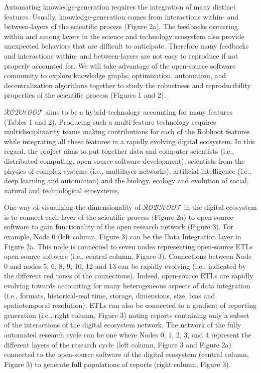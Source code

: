 \documentclass[10pt, a4paper, twocolumn]{article} %
\begin{document}
{  Automating knowledge-generation requires the integration of many
  distinct features. Usually, knowledge-generation comes from
  interactions within- and between-layers of the scientific process
  (Figure 2a). The feedbacks occurring within and among layers in the
  science and technology ecosystem also provide unexpected behaviors
  that are difficult to anticipate. Therefore many feedbacks and
  interactions within- and between-layers are not easy to reproduce if
  not properly accounted for. We will take advantage of the
  open-source software community to explore knowledge graphs,
  optimization, automation, and decentralization algorithms together
  to study the robustness and reproducibility properties of the
  scientific process (Figures 1 and 2).

  {\bf $\mathcal{ROBHOOT}$} aims to be a hybrid-technology accounting
  for many features (Tables 1 and 2). Producing such a multi-feature
  technology requires multidisciplinarity teams making contributions
  for each of the Robhoot features while integrating all these
  features in a rapidly evolving digital ecosystem. In this regard,
  the project aims to put together data and computer scientists (i.e.,
  distributed computing, open-source software development), scientists
  from the physics of complex systems (i.e., multilayer networks),
  artificial intelligence (i.e., deep learning and automation) and the
  biology, ecology and evolution of social, natural and technological
  ecosystems.

  One way of visualizing the dimensionality of $\mathcal{ROBHOOT}$ in
  the digital ecosystem is to connect each layer of the scientific
  process (Figure 2a) to open-source software to gain functionality of
  the open research network (Figure 3). For example, Node 0 (left
  column, Figure 3) can be the Data Integration layer in Figure
  2a. This node is connected to seven nodes representing open-source
  ETLs open-source software (i.e., central column, Figure
  3). Connections between Node 0 and nodes 5, 6, 8, 9, 10, 12 and 13
  can be rapidly evolving (i.e., indicated by the different red tones
  of the connections). Indeed, open-source ETLs are rapidly evolving
  towards accounting for many heterogeneous aspects of data
  integration (i.e., formats, historical-real time, storage,
  dimensions, size, bias and spatiotemporal resolution). ETLs can also
  be connected to a gradient of reporting generation (i.e., right
  column, Figure 3) noting reports containing only a subset of the
  interactions of the digital ecosystem network. The network of the
  fully automated research cycle can be one where Nodes 0, 1, 2, 3,
  and 4 represent the different layers of the research cycle (left
  column, Figure 3 and Figure 2a) connected to the open-source
  software of the digital ecosystem (central column, Figure 3) to
  generate full populations of reports (right column, Figure 3).

}
\end{document}
